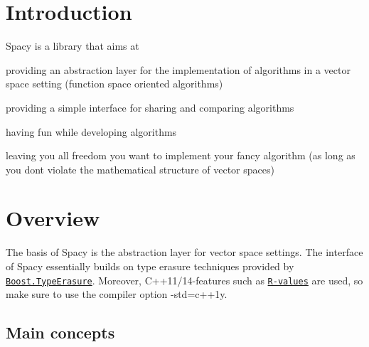 \hypertarget{index_sec_intro}{}\section{Introduction}\label{index_sec_intro}
Spacy is a library that aims at
\begin{DoxyItemize}
\item providing an abstraction layer for the implementation of algorithms in a vector space setting (function space oriented algorithms)
\item providing a simple interface for sharing and comparing algorithms
\item having fun while developing algorithms
\item leaving you all freedom you want to implement your fancy algorithm (as long as you don\textquotesingle{}t violate the mathematical structure of vector spaces)
\end{DoxyItemize}\hypertarget{index_sec_overview}{}\section{Overview}\label{index_sec_overview}
The basis of Spacy is the abstraction layer for vector space settings. The interface of Spacy essentially builds on type erasure techniques provided by \href{http://www.boost.org/doc/libs/1_59_0/doc/html/boost_typeerasure.html}{\tt Boost.\+Type\+Erasure}. Moreover, C++11/14-\/features such as \href{http://en.cppreference.com/w/cpp/language/value_category}{\tt R-\/values} are used, so make sure to use the compiler option -\/std=c++1y.\hypertarget{index_sub_concepts}{}\subsection{Main concepts}\label{index_sub_concepts}

